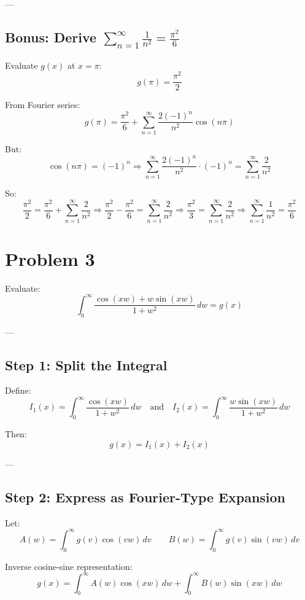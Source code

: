 \documentclass{article}
\begin{document}
---

\subsection*{Bonus: Derive \( \sum_{n=1}^{\infty} \frac{1}{n^2} = \frac{\pi^2}{6} \)}

Evaluate \( g(x) \) at \( x = \pi \):
\[
g(\pi) = \frac{\pi^2}{2}
\]

From Fourier series:
\[
g(\pi) = \frac{\pi^2}{6} + \sum_{n=1}^{\infty} \frac{2(-1)^n}{n^2} \cos(n\pi)
\]

But:
\[
\cos(n\pi) = (-1)^n \Rightarrow \sum_{n=1}^{\infty} \frac{2(-1)^n}{n^2} \cdot (-1)^n = \sum_{n=1}^{\infty} \frac{2}{n^2}
\]

So:
\[
\frac{\pi^2}{2} = \frac{\pi^2}{6} + \sum_{n=1}^{\infty} \frac{2}{n^2}
\Rightarrow \frac{\pi^2}{2} - \frac{\pi^2}{6} = \sum_{n=1}^{\infty} \frac{2}{n^2}
\Rightarrow \frac{\pi^2}{3} = \sum_{n=1}^{\infty} \frac{2}{n^2}
\Rightarrow \sum_{n=1}^{\infty} \frac{1}{n^2} = \boxed{ \frac{\pi^2}{6} }
\]

\newpage
\section*{Problem 3}

Evaluate:
\[
\int_0^\infty \frac{\cos(xw) + w \sin(xw)}{1 + w^2} \, dw = g(x)
\]

---

\subsection*{Step 1: Split the Integral}

Define:
\[
I_1(x) = \int_0^\infty \frac{\cos(xw)}{1 + w^2} \, dw
\quad\text{and}\quad
I_2(x) = \int_0^\infty \frac{w \sin(xw)}{1 + w^2} \, dw
\]

Then:
\[
g(x) = I_1(x) + I_2(x)
\]

---

\subsection*{Step 2: Express as Fourier-Type Expansion}

Let:
\[
A(w) = \int_0^\infty g(v) \cos(vw) \, dv
\qquad
B(w) = \int_0^\infty g(v) \sin(vw) \, dv
\]

Inverse cosine-sine representation:
\[
g(x) = \int_0^\infty A(w) \cos(xw) \, dw + \int_0^\infty B(w) \sin(xw) \, dw
\]
\end{document}
